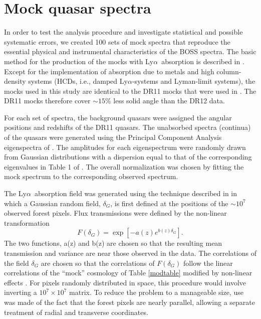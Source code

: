 \documentclass{aa}
\newcommand{\lya}{Ly$\alpha$}
\newcommand{\Lya}{Ly$\alpha$~}
\begin{document}
\section{Mock quasar spectra}
\label{mocksec}


In order to test the analysis procedure and
investigate statistical and possible systematic errors, we created 100 sets
of mock spectra that
reproduce the essential
physical and instrumental characteristics of the BOSS spectra.
The basic method for the production of the mocks with \Lya absorption
is described
in \citet{2012JCAP...01..001F}.
Except for the implementation of absorption due to metals and
high column-density systems (HCDs, i.e., damped \lya-systems and Lyman-limit
systems),
the mocks used in this study are identical to the
DR11 mocks \citep{2015JCAP...05..060B}
that were  used in \citet{2015A&A...574A..59D}.
The DR11 mocks therefore cover $\sim15\%$ less solid angle than the DR12 data.


For each set of spectra, the background
quasars were assigned  the angular positions and
redshifts of the DR11 quasars.
The unabsorbed spectra (continua)
of the quasars were generated using the Principal
Component Analysis  eigenspectra of \citet{2005ApJ...618..592S}.
The amplitudes for each eigenspectrum were randomly drawn from Gaussian
distributions with a dispersion equal to that of
the corresponding eigenvalues in
Table 1 of \citet{2006ApJS..163..110S}.
The overall normalization was chosen by fitting the  mock spectrum to the
corresponding observed spectrum.


  The \Lya absorption field was generated 
  using the technique described in \citet{2012JCAP...01..001F}
  in which a
  Gaussian random field, $\delta_G$, is first
  defined at the positions of the $\sim10^7$ observed forest pixels.
  Flux transmissions were defined by the non-linear transformation
  \begin{displaymath}
    F(\delta_G) =
    \exp\left[-a(z)e^{b(z)\delta_G}
      \right].
  \end{displaymath}
  The two functions, a(z) and b(z) are chosen so that the resulting mean
  transmission and  variance are near those observed in the data.
  The correlations of the field $\delta_G$ are chosen so that
  the correlations of $F(\delta_G)$
  follow the linear correlations of the ``mock'' cosmology
  of Table \ref{modtable} modified by non-linear effects \citep{2003ApJ...585...34M}.
  For pixels randomly distributed in space, this procedure would involve
  inverting a $10^7\times10^7$ matrix.  To reduce the problem
  to a manageable size, use was made
  of the fact that the forest pixels are nearly parallel, allowing
  a separate treatment of radial and transverse coordinates.
\end{document}
